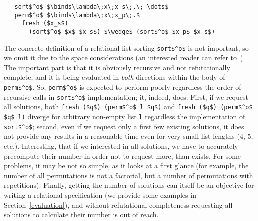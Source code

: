 \begin{lstlisting}
   sort$^o$ $\binds\lambda\;x\;x_s\;.\; \dots$
   perm$^o$ $\binds\lambda\;x\;x_p\;.$
     fresh ($x_s$) 
       (sort$^o$ $x$ $x_s$) $\wedge$ (sort$^o$ $x_p$ $x_s$) 
\end{lstlisting}

The concrete definition of a relational list sorting \lstinline|sort$^o$| is not important, so we
omit it due to the space considerations (an interested reader can refer to~\cite{OCanren}). The important part 
is that it is obviously recursive and not refutationally complete, and it is being evaluated 
in \emph{both} directions within the body of \lstinline|perm$^o$|. So, \lstinline|perm$^o$| is expected 
to perform poorly regardless the order of recursive calls in \lstinline|sort$^o$| implementation; it, 
indeed, does. First, if we request all solutions, both \lstinline|fresh ($q$) (perm$^o$ l $q$)| and \lstinline|fresh ($q$) (perm$^o$ $q$ l)| diverge for arbitrary non-empty list \lstinline|l| regardless the implementation of \lstinline|sort$^o$|; second, even if we request only a first few existing solutions, it does not provide any results in a reasonable time even for very small list lengths (4, 5, etc.). Interesting, that if we interested in all solutions,
we have to accurately precompute their number in order not to request more, than exists. For some problems,
it may be not so simple, as it looks at a first glance (for example, the number of all permutations is
not a factorial, but a number of permutations with repetitions). Finally, getting the number of solutions can 
itself be an objective for writing a relational specification (we provide some examples in Section~\ref{evaluation}),
and without refutational completeness requesting all solutions to calculate their number is out of
reach.
